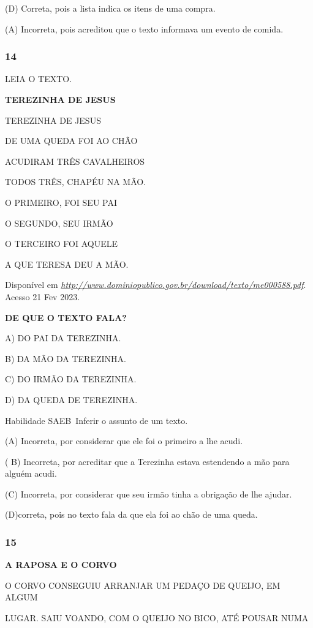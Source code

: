 \begin{escola}
(D) Correta, pois a lista indica os itens de uma compra.

(A) Incorreta, pois acreditou que o texto informava um evento de comida.

\subsubsection{14}\label{section-70}

LEIA O TEXTO.

\textbf{TEREZINHA DE JESUS}

TEREZINHA DE JESUS

DE UMA QUEDA FOI AO CHÃO

ACUDIRAM TRÊS CAVALHEIROS

TODOS TRÊS, CHAPÉU NA MÃO.

O PRIMEIRO, FOI SEU PAI

O SEGUNDO, SEU IRMÃO

O TERCEIRO FOI AQUELE

A QUE TERESA DEU A MÃO.

Disponível em
\href{http://www.dominiopublico.gov.br/download/texto/me000588.pdf}{\emph{http://www.dominiopublico.gov.br/download/texto/me000588.pdf}}.
Acesso 21 Fev 2023.

\textbf{DE QUE O TEXTO FALA?}

A) DO PAI DA TEREZINHA.

B) DA MÃO DA TEREZINHA.

C) DO IRMÃO DA TEREZINHA.

D) DA QUEDA DE TEREZINHA.

Habilidade SAEB~Inferir o assunto de um texto.

(A) Incorreta, por considerar que ele foi o primeiro a lhe acudi.

( B) Incorreta, por acreditar que a Terezinha estava estendendo a mão
para alguém acudi.

(C) Incorreta, por considerar que seu irmão tinha a obrigação de lhe
ajudar.

(D)correta, pois no texto fala da que ela foi ao chão de uma queda.

\subsubsection{15 }\label{section-71}

\textbf{A RAPOSA E O CORVO}

O CORVO CONSEGUIU ARRANJAR UM PEDAÇO DE QUEIJO, EM ALGUM

LUGAR. SAIU VOANDO, COM O QUEIJO NO BICO, ATÉ POUSAR NUMA


\end{escola}
